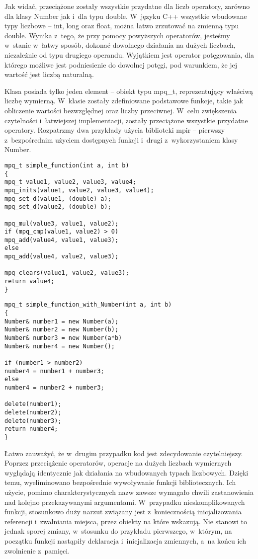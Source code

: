Jak widać, przeciążone zostały wszystkie przydatne dla liczb operatory, zarówno dla klasy Number jak i~dla typu double. W~języku C++ wszystkie wbudowane typy liczbowe -- int, long oraz float, można łatwo zrzutować na zmienną typu double. Wynika z~tego, że przy pomocy powyższych operatorów, jesteśmy w~stanie w~łatwy sposób, dokonać dowolnego działania na dużych liczbach, niezależnie od typu drugiego operandu. Wyjątkiem jest operator potęgowania, dla którego możliwe jest podniesienie do dowolnej potęgi, pod warunkiem, że jej wartość jest liczbą naturalną.

Klasa posiada tylko jeden element – obiekt typu mpq\_t, reprezentujący właściwą liczbę wymierną. W~klasie zostały zdefiniowane podstawowe funkcje, takie jak obliczenie wartości bezwzględnej oraz liczby przeciwnej. W~celu zwiększenia czytelności i~łatwiejszej implementacji, zostały przeciążone wszystkie przydatne operatory. Rozpatrzmy dwa przykłady użycia biblioteki mpir – pierwszy z~bezpośrednim użyciem dostępnych funkcji i~drugi z~wykorzystaniem klasy Number.

\begin{lstlisting}
mpq_t simple_function(int a, int b)
{
mpq_t value1, value2, value3, value4;
mpq_inits(value1, value2, value3, value4);
mpq_set_d(value1, (double) a);
mpq_set_d(value2, (double) b);

mpq_mul(value3, value1, value2);
if (mpq_cmp(value1, value2) > 0)
mpq_add(value4, value1, value3);
else
mpq_add(value4, value2, value3);

mpq_clears(value1, value2, value3);
return value4;
}
\end{lstlisting}

\begin{lstlisting}
mpq_t simple_function_with_Number(int a, int b)
{
Number& number1 = new Number(a);
Number& number2 = new Number(b);
Number& number3 = new Number(a*b)
Number& number4 = new Number();

if (number1 > number2)
number4 = number1 + number3;
else
number4 = number2 + number3;

delete(number1);
delete(number2);
delete(number3);
return number4;
}
\end{lstlisting}

Łatwo zauważyć, że w~drugim przypadku kod jest zdecydowanie czytelniejszy. Poprzez przeciążenie operatorów, operacje na dużych liczbach wymiernych wyglądają identycznie jak działania na wbudowanych typach liczbowych. Dzięki temu, wyeliminowano bezpośrednie wywoływanie funkcji bibliotecznych. Ich użycie, pomimo charakterystycznych nazw zawsze wymagało chwili zastanowienia nad kolejno przekazywanymi argumentami. W~przypadku nieskomplikowanych funkcji, stosunkowo duży narzut związany jest z~koniecznością inicjalizowania referencji i~zwalniania miejsca, przez obiekty na które wskazują. Nie stanowi to jednak sporej zmiany, w~stosunku do przykładu pierwszego, w~którym, na początku funkcji nastąpiły deklaracja i~inicjalizacja zmiennych, a~na końcu ich zwolnienie z~pamięci.

